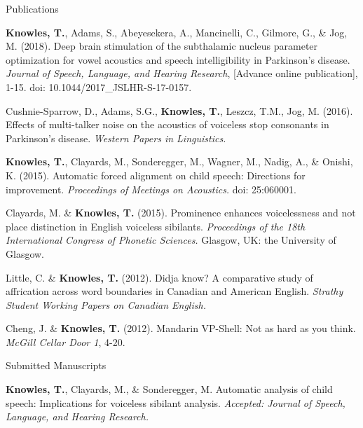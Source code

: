 \documentclass{resume} %
\begin{document}


\begin{rSection}{Publications}

{\bf Knowles, T.}, Adams, S., Abeyesekera, A., Mancinelli, C., Gilmore, G., \& Jog, M. (2018). Deep brain stimulation of the subthalamic nucleus parameter optimization for vowel acoustics and speech intelligibility in Parkinson's disease. \emph{Journal of Speech, Language, and Hearing Research}, [Advance online publication], 1-15. doi: 10.1044/2017\_JSLHR-S-17-0157.

Cushnie-Sparrow, D., Adams, S.G., {\bf Knowles, T.}, Leszcz, T.M., Jog, M. (2016). Effects of multi-talker noise on the acoustics of voiceless stop consonants in Parkinson's disease. \emph{Western Papers in Linguistics.}

{\bf Knowles, T.}, Clayards, M., Sonderegger, M., Wagner, M., Nadig, A., \& Onishi, K. (2015). Automatic forced alignment on child speech: Directions for improvement. \emph{Proceedings of Meetings on Acoustics.} doi: 25:060001.

Clayards, M. \& {\bf Knowles, T.} (2015). Prominence enhances voicelessness and not place distinction in English voiceless sibilants. \emph{Proceedings of the 18th International Congress of Phonetic Sciences.} Glasgow, UK: the University of Glasgow.

Little, C. \& {\bf Knowles, T.} (2012). Didja know? A comparative study of affrication across word boundaries in Canadian and American English. \emph{Strathy Student Working Papers on Canadian English.}

Cheng, J. \& {\bf Knowles, T.} (2012). Mandarin VP-Shell: Not as hard as you think. \emph{McGill Cellar Door 1}, 4-20.

\end{rSection}

\begin{rSection}{Submitted Manuscripts}


{\bf Knowles, T.}, Clayards, M., \& Sonderegger, M. Automatic analysis of child speech: Implications for voiceless sibilant analysis. \emph{Accepted: Journal of Speech, Language, and Hearing Research.}

\end{rSection}
\end{document}
